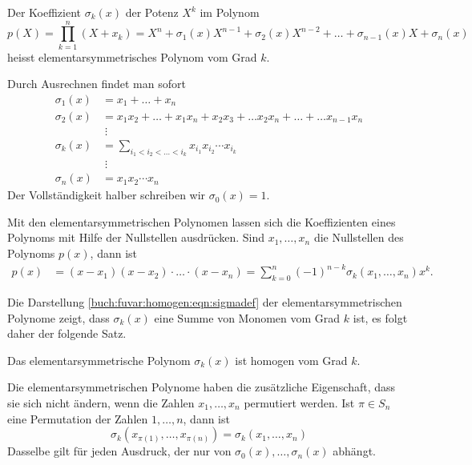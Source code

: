 \begin{definition}
Der Koeffizient $\sigma_k(x)$ der Potenz $X^k$ im Polynom
\[
p(X)
=
\prod_{k=1}^n
(X+x_k)
=
X^n + \sigma_1(x) X^{n-1} + \sigma_2(x) X^{n-2} + \ldots + \sigma_{n-1}(x) X + \sigma_n(x)
\]
heisst {elementarsymmetrisches Polynom} vom Grad $k$.
\end{definition}

Durch Ausrechnen findet man sofort
\begin{equation}
\begin{aligned}
\sigma_1(x)
&=
x_1+\ldots+x_n
\\
\sigma_2(x)
&=
x_1x_2+\ldots+x_1x_n+x_2x_3+\ldots x_2x_n+\ldots +\ldots x_{n-1}x_n
\\[-3pt]
&\;\vdots
\\
\sigma_k(x)
&=
\sum_{i_1<i_2<\ldots<i_k}
x_{i_1}x_{i_2}\cdots x_{i_k}
\\
&\;\vdots
\\[-3pt]
\sigma_n(x)
&=
x_1x_2\cdots x_n
\end{aligned}
\label{buch:fuvar:homogen:eqn:sigmadef}
\end{equation}
Der Vollständigkeit halber schreiben wir $\sigma_0(x)=1$.

Mit den elementarsymmetrischen Polynomen lassen sich die Koeffizienten
eines Polynoms mit Hilfe der Nullstellen ausdrücken.
Sind $x_1,\dots,x_n$ die Nullstellen des Polynoms $p(x)$, dann ist
\begin{align*}
p(x)
&=
(x-x_1)(x-x_2)\cdot\ldots\cdot(x-x_n)
=
\sum_{k=0}^n (-1)^{n-k}\sigma_k(x_1,\dots,x_n) x^k.
\end{align*}

Die Darstellung \eqref{buch:fuvar:homogen:eqn:sigmadef} der
elementarsymmetrischen Polynome zeigt, dass $\sigma_k(x)$ eine Summe
von Monomen vom Grad $k$ ist, es folgt daher der folgende Satz.

\begin{satz}
\label{buch:fuvar:homogen:satz:elementarsymmetrischhomogen}
Das elementarsymmetrische Polynom $\sigma_k(x)$ ist homogen vom Grad $k$.
\end{satz}

Die elementarsymmetrischen Polynome haben die zusätzliche Eigenschaft,
dass sie sich nicht ändern, wenn die Zahlen $x_1,\dots,x_n$ permutiert
werden.
Ist $\pi\in S_n$ eine Permutation der Zahlen $1,\dots,n$, dann ist
\[
\sigma_k(x_{\pi(1)},\dots,x_{\pi(n)})
=
\sigma_k(x_1,\dots,x_n)
\]
Dasselbe gilt für jeden Ausdruck, der nur von $\sigma_0(x),\dots,\sigma_n(x)$ 
abhängt.

